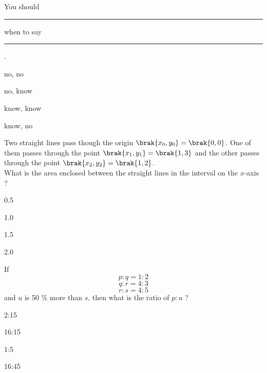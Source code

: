 \iffalse
\title{GATE Questions 21}
\author{EE24BTECH11012 - Bhavanisankar G S}
\section{ph}
\chapter{2022}
\fi
	\item You should \rule{1cm}{0.1pt} when to say \rule{1cm}{0.1pt}.
		\begin{enumerate}
		\end{enumerate}
	\item Two straight lines pass though the origin $\brak{x_0, y_0} = \brak{0,0}$. One of them passes through the point $\brak{x_1, y_1} = \brak{1,3}$ and the other passes through the point $\brak{x_2, y_2} = \brak{1,2}$. \\
		What is the area enclosed between the straight lines in the interval  on the $x$-axis ?
		\begin{enumerate}
				\begin{multicols}{4}
				\item 0.5
				\item 1.0
				\item 1.5
				\item 2.0
				\end{multicols}
		\end{enumerate}
	\item If 
				$$ p : q = 1 : 2 $$
				$$ q : r = 4 : 3 $$
				$$ r : s = 4 : 5 $$
				and $u$ is 50 \% more than $s$, then what is the ratio of $p:u$ ?
				\begin{enumerate}
						\begin{multicols}{4}
						\item 2:15
						\item 16:15
						\item 1:5
						\item 16:45
						\end{multicols}
				\end{enumerate}

